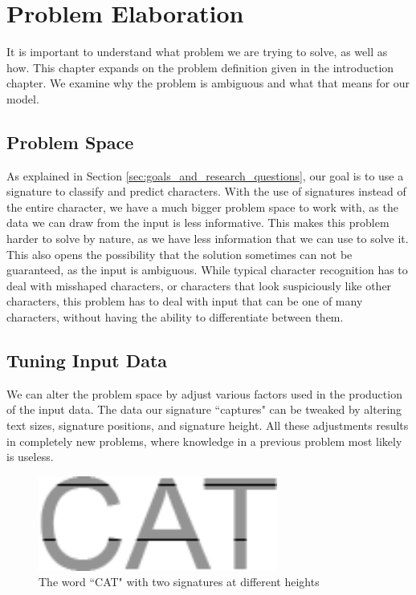 
\chapter{Problem Elaboration}
\label{ch:problem}
It is important to understand what problem we are trying to solve, as well as how. This chapter expands on the problem definition given in the introduction chapter. We examine why the problem is ambiguous and what that means for our model. 


\section{Problem Space}
As explained in Section \ref{sec:goals_and_research_questions}, our goal is to use a signature to classify and predict characters. With the use of signatures instead of the entire character, we have a much bigger problem space to work with, as the data we can draw from the input is less informative. This makes this problem harder to solve by nature, as we have less information that we can use to solve it. This also opens the possibility that the solution sometimes can not be guaranteed, as the input is ambiguous. While typical character recognition has to deal with misshaped characters, or characters that look suspiciously like other characters, this problem has to deal with input that can be one of many characters, without having the ability to differentiate between them.


\section{Tuning Input Data}
\label{sec:tuning_input_data}
We can alter the problem space by adjust various factors used in the production of the input data. The data our signature ``captures" can be tweaked by altering text sizes, signature positions, and signature height. All these adjustments results in completely new problems, where knowledge in a previous problem most likely is useless.

\begin{figure}[ht]
    \centering
    \includegraphics[width=0.7\textwidth]{fig/chapter2/signature_multiple.png}
    \caption{The word ``CAT" with two signatures at different heights}
    \label{fig:thesis-signature-comparison}
\end{figure}

